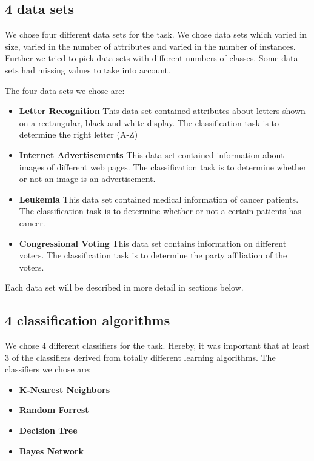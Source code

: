 \documentclass{article}
\begin{document}
\subsection{4 data sets}
We chose four different data sets for the task. We chose data sets which varied in size, varied in the number of attributes and varied in the number of instances. Further we tried to pick data sets with different numbers of classes. Some data sets had missing values to take into account.

The four data sets we chose are:

\begin{itemize}
\item \textbf{Letter Recognition}
This data set contained attributes about letters shown on a rectangular, black and white display. The classification task is to determine the right letter (A-Z)
\item \textbf{Internet Advertisements}
This data set contained information about images of different web pages. The classification task is to determine whether or not an image is an advertisement.
\item \textbf{Leukemia}
This data set contained medical information of cancer patients. The classification task is to determine whether or not a certain patients has cancer.
\item \textbf{Congressional Voting}
This data set contains information on different voters. The classification task is to determine the party affiliation of the voters.
\end{itemize}

Each data set will be described in more detail in sections below.


\subsection{4 classification algorithms}
We chose 4 different classifiers for the task. Hereby, it was important that at least 3 of the classifiers derived from totally different learning algorithms. The classifiers we chose are:

\begin{itemize}
\item \textbf{K-Nearest Neighbors}
\item \textbf{Random Forrest}
\item \textbf{Decision Tree}
\item \textbf{Bayes Network}
\end{itemize}
\end{document}
